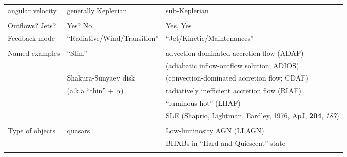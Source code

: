 \documentclass[11pt,a4paper]{article}
\begin{document}
\begin{landscape}
\begin{table}[]
\begin{tabular}{  p{50mm}   p{60mm}   p{100mm}  }
      angular velocity                               & generally  Keplerian                                    & sub-Keplerian \\
      &  &  \\
      Outflows? Jets?                               & Yes? No.                                          & Yes, Yes \\
      Feedback mode                               & ``Radiative/Wind/Transition''                 & ``Jet/Kinetic/Maintenances'' \\
      & & \\
    Named examples                           &   ``Slim''                        & advection dominated accretion flow (ADAF)\\
                                                           &                                             & (adiabatic inflow-outflow solution; ADIOS) \\
                                                           &   Shakura-Sunyaev disk                & (convection-dominated accretion flow; CDAF) \\
                                                           &   (a.k.a ``thin'' + $\alpha$)                    & radiatively inefficient accretion flow (RIAF)\\
                                                           &                                                         & ``luminous hot''  (LHAF)\\
                                                          &                                                          & SLE (Shaprio, Lightman, Eardley, 1976, ApJ, {\bf 204}, {\it 187})   \\ 
      & & \\
  Type of objects            & quasars                                           & Low-luminosity AGN (LLAGN) \\
                                                               &                                                      & BHXBs in ``Hard and Quiescent'' state \\      
& & \\
    \hline
    \hline
\end{tabular}
\end{table}
\end{landscape}
\end{document}
